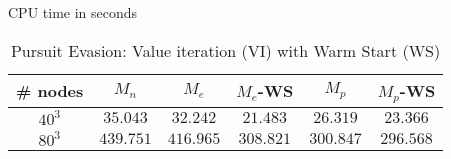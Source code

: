 \begin{table}
\centering
\caption{Pursuit Evasion: Value iteration (VI) with Warm Start (WS)} CPU time in seconds
\begin{tabular}{|c| c| c| c| c| c|}
\hline
\# nodes & $M_n$ & $M_e$ &  $M_e$-WS & $M_p$ & $M_p$-WS \\ \hline
$40^3$ & $35.043$ & $32.242$ & $21.483$ & $26.319$ & $23.366$ \\ \hline
$80^3$ & $439.751$ & $416.965$ & $308.821$ & $300.847$ & $296.568$\\ \hline
\end{tabular}
\label{tab:ws_pe}
\end{table}
